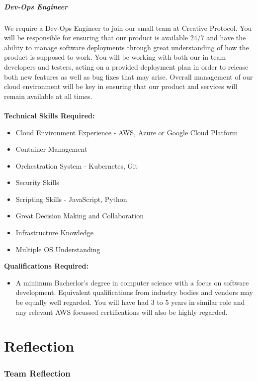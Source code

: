 \documentclass[11pt, oneside, a4paper, titlepage]{article}
\begin{document}
\subsubsection{Dev-Ops Engineer}
We require a Dev-Ops Engineer to join our small team at Creative Protocol. You will be responsible for ensuring that our product is available 24/7 and have the ability to manage software deployments through great understanding of how the product is supposed to work. You will be working with both our in team developers and testers, acting on a provided deployment plan in order to release both new features as well as bug fixes that may arise. Overall management of our cloud environment will be key in ensuring that our product and services will remain available at all times.  
\\
\\
\textbf{Technical Skills Required:}
\begin{itemize}
	\item Cloud Environment Experience - AWS, Azure or Google Cloud Platform
	\item Container Management
	\item Orchestration System - Kubernetes, Git
	\item Security Skills
	\item Scripting Skills - JavaScript, Python
	\item Great Decision Making and Collaboration
	\item Infrastructure Knowledge
	\item Multiple OS Understanding
\end{itemize}
\hfill \break
\textbf{Qualifications Required:}
\begin{itemize}
	\item A minimum Bacherlor’s degree in computer science with a focus on software development. Equivalent qualifications from industry bodies and vendors may be equally well regarded. You will have had 3 to 5 years in similar role and any relevant AWS focussed certifications will also be highly regarded. 
\end{itemize}
\newpage


\part{Reflection}
\section{Team Reflection}
\end{document}
